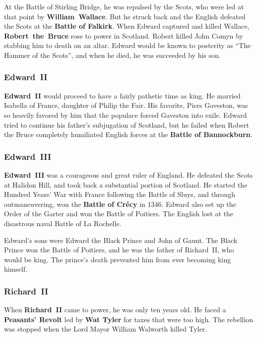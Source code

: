At the Battle of Stirling Bridge, he was repulsed by the Scots,
who were led at that point by \textbf{William~Wallace}.
But he struck back and the English defeated the Scots at the \textbf{Battle of Falkirk}.
When Edward captured and killed Wallace, \textbf{Robert~the~Bruce} rose to power in Scotland.
Robert killed John Comyn by stabbing him to death on an altar.
Edward would be known to posterity as ``The Hammer of the Scots'',
and when he died, he was succeeded by his son.

\subsubsection*{Edward~II}

\textbf{Edward~II} would proceed to have a fairly pathetic time as king.
He married Isabella of France, daughter of Philip the Fair.
His favorite, Piers Gaveston,
was so heavily favored by him that the populace forced Gaveston into exile.
Edward tried to continue his father's subjugation of Scotland,
but he failed when Robert the Bruce completely humiliated English forces
at the \textbf{Battle of Bannockburn}.

\subsubsection*{Edward~III}

\textbf{Edward~III} was a courageous and great ruler of England.
He defeated the Scots at Halidon Hill, and took back a substantial portion of Scotland.
He started the Hundred Years' War with France following the Battle of Sluys,
and through outmaneuvering, won the \textbf{Battle of Cr\'ecy} in 1346.
Edward also set up the Order of the Garter and won the Battle of Poitiers.
The English lost at the disastrous naval Battle of La Rochelle.

Edward's sons were Edward the Black Prince and John of Gaunt.
The Black Prince won the Battle of Poitiers, and he was the father of Richard~II, who would be king.
The prince's death prevented him from ever becoming king himself.

\subsubsection*{Richard~II}

When \textbf{Richard~II} came to power, he was only ten years old.
He faced a \textbf{Peasants' Revolt} led by \textbf{Wat Tyler} for taxes that were too high.
The rebellion was stopped when the Lord Mayor William Walworth killed Tyler.

